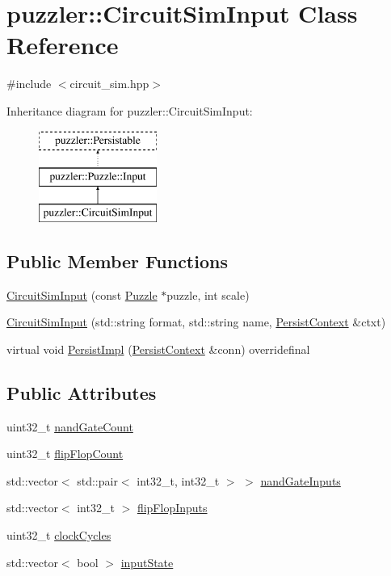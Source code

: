 \hypertarget{a00003}{}\section{puzzler\+:\+:Circuit\+Sim\+Input Class Reference}
\label{a00003}


{\ttfamily \#include $<$circuit\+\_\+sim.\+hpp$>$}

Inheritance diagram for puzzler\+:\+:Circuit\+Sim\+Input\+:\begin{figure}[H]
\begin{center}
\leavevmode
\includegraphics[height=3.000000cm]{a00003}
\end{center}
\end{figure}
\subsection*{Public Member Functions}
\begin{DoxyCompactItemize}
\item 
\hyperlink{a00003_a68ac9f2ae2bc61a6638569b743a48408}{Circuit\+Sim\+Input} (const \hyperlink{a00026}{Puzzle} $\ast$puzzle, int scale)
\item 
\hyperlink{a00003_a81bf65f67dfab4c62ea0f32eeed0edd2}{Circuit\+Sim\+Input} (std\+::string format, std\+::string name, \hyperlink{a00025}{Persist\+Context} \&ctxt)
\item 
virtual void \hyperlink{a00003_a0dfeb0175d1af1f40424130478bc1acf}{Persist\+Impl} (\hyperlink{a00025}{Persist\+Context} \&conn) overridefinal
\end{DoxyCompactItemize}
\subsection*{Public Attributes}
\begin{DoxyCompactItemize}
\item 
uint32\+\_\+t \hyperlink{a00003_a2fee4aa543c7278fc1d96a78b0e50555}{nand\+Gate\+Count}
\item 
uint32\+\_\+t \hyperlink{a00003_a4a1d2f346b50c19b6a580604342fec41}{flip\+Flop\+Count}
\item 
std\+::vector$<$ std\+::pair$<$ int32\+\_\+t, int32\+\_\+t $>$ $>$ \hyperlink{a00003_a321be266e96bc3e9b37fedb6fbfda436}{nand\+Gate\+Inputs}
\item 
std\+::vector$<$ int32\+\_\+t $>$ \hyperlink{a00003_ade124cb322a0d121fee6c2288927abc9}{flip\+Flop\+Inputs}
\item 
uint32\+\_\+t \hyperlink{a00003_accda82ef15ce9c608214fec750f34bac}{clock\+Cycles}
\item 
std\+::vector$<$ bool $>$ \hyperlink{a00003_af9ad7bc970d5e8bb5822f09169b71fb4}{input\+State}
\end{DoxyCompactItemize}
